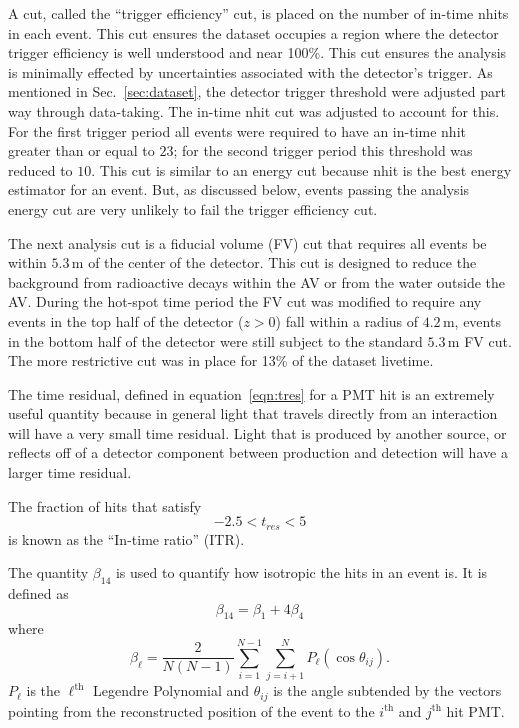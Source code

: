 A cut, called the ``trigger efficiency'' cut,  is placed on the number of
in-time nhits in each event.
This cut ensures the dataset occupies a region where the detector trigger
efficiency is well understood and near 100\%.
This cut ensures the analysis is minimally effected by uncertainties
associated with the detector's trigger.
As mentioned in Sec.~\ref{sec:dataset}, the detector trigger threshold were adjusted
part way through data-taking. The in-time nhit cut was adjusted to
account for this.
For the first trigger period all events were required to have an in-time
nhit greater than or equal to $23$; for the second trigger period this
threshold was reduced to $10$.
This cut is similar to an energy cut because nhit is the best energy estimator
for an event. But, as discussed below, events passing the analysis energy cut
are very unlikely to fail the trigger efficiency cut.

The next analysis cut is a fiducial volume (FV) cut that requires all events
be within $5.3$\,m of the center of the detector.
This cut is designed to reduce the background from radioactive decays within
the AV or from the water outside the AV\@.
During the hot-spot time period the FV cut was modified to require any events in the
top half of the detector ($z > 0$) fall within a radius of $4.2$\,m,
events in the bottom half of the detector were still subject to the standard
$5.3$\,m FV cut.
The more restrictive cut was in place for 13\% of the dataset livetime.

The time residual, defined in equation~\ref{eqn:tres} for a PMT hit is an extremely
useful quantity because in general light that travels directly from an
interaction will have a very small time residual.
Light that is produced by another source, or reflects off of a detector component
between production and detection will have a larger time residual.


The fraction of hits that satisfy
\begin{equation}
    -2.5 < t_{res} < 5
\end{equation}
is known as the ``In-time ratio'' (ITR).

The quantity $\beta_{14}$ is used to quantify how isotropic the hits
in an event is. It is defined as
\begin{equation}
    \beta_{14} = \beta_{1} + 4\beta_{4}
\end{equation}
where
\begin{equation}
\beta_{\ell} = \frac{2}{N(N-1)}\sum_{i=1}^{N-1}\sum_{j=i+1}^{N}P_{\ell}(\cos\theta_{ij})\text{.}
\end{equation}
$P_{\ell}$ is the $\ell^{\text{th}}$ Legendre Polynomial and
$\theta_{ij}$ is the angle subtended by the vectors pointing
from the reconstructed position of the event to the $i^{\text{th}}$ and
$j^{\text{th}}$ hit PMT\@.

